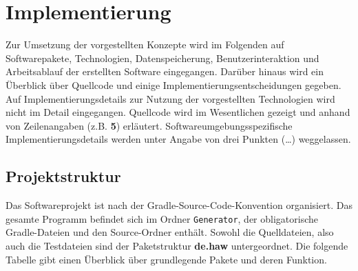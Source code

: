 
\chapter{Implementierung}
Zur Umsetzung der vorgestellten Konzepte wird im Folgenden auf Softwarepakete, Technologien, Datenspeicherung,
Benutzerinteraktion und Arbeitsablauf der erstellten \mbox{Software} eingegangen.
Darüber hinaus wird ein Überblick über Quellcode und einige Implementierungsentscheidungen gegeben.
Auf Implementierungsdetails zur Nutzung der vorgestellten Technologien wird nicht im Detail eingegangen.
Quellcode wird im Wesentlichen gezeigt und anhand von Zeilenangaben (z.B. \textbf{5}) erläutert.
Softwareumgebungsspezifische Implementierungsdetails werden unter Angabe von drei Punkten (\ldots) weggelassen.

\section{Projektstruktur}
Das Softwareprojekt ist nach der Gradle-Source-Code-Konvention organisiert.
Das gesamte Programm befindet sich im Ordner \texttt{Generator}, der obligatorische Gradle-Dateien und den
Source-Ordner enthält.
Sowohl die Quelldateien, also auch die Testdateien sind der Paketstruktur \textbf{de.haw} untergeordnet.
Die folgende Tabelle gibt einen Überblick über grundlegende Pakete und deren Funktion.


